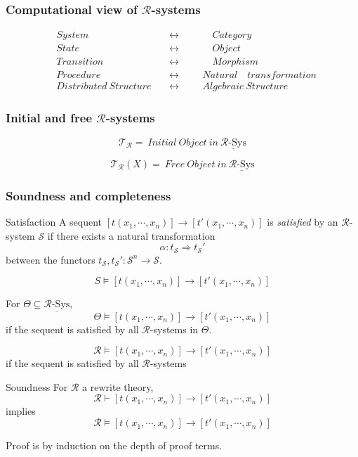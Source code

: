 \documentclass{beamer}
\begin{document}
\begin{frame}
    \frametitle{Computational view of $\mathcal{R}$-systems}
    \large
    \begin{align*}
        &System \quad &&\leftrightarrow  &&&\quad Category \\
        &State \quad &&\leftrightarrow &&&\quad  Object \\
        &Transition \quad &&\leftrightarrow &&&\quad Morphism \\ 
        &Procedure \quad &&\leftrightarrow &&&Natural \quad transformation \\ 
        &Distributed\ Structure\ &&\leftrightarrow &&& Algebraic\ Structure 
    \end{align*}
\end{frame}
\begin{frame}
    \large
    \frametitle{Initial and free $\mathcal{R}$-systems}
   
    $$\mathcal{T_R} =\ Initial\ Object\ in\ \underline{\mathcal{R}\text{-Sys}} $$ 


    \bigskip
    $$\mathcal{T_R}(X) =\ Free\ Object\ in\ \underline{\mathcal{R}\text{-Sys}} $$ 
    
\end{frame}
\begin{frame}
    \frametitle{Soundness and completeness}
    \scriptsize
    \begin{block}{Satisfaction}
        A sequent $[t(x_1,\cdots,x_n)] \rightarrow [t'(x_1,\cdots,x_n)]$ is \emph{satisfied} by 
        an $\mathcal{R}$-system $\mathcal{S}$ if there exists a natural transformation
        $$ \alpha: t_\mathcal{S} \Rightarrow t_\mathcal{S}'$$ 
        between the functors $t_\mathcal{S},t_\mathcal{S}':\mathcal{S}^n \rightarrow \mathcal{S}.$

        $$ S \models [t(x_1,\cdots,x_n)] \rightarrow [t'(x_1,\cdots,x_n)]$$
    \end{block}
\pause

For $\Theta \subseteq \underline{\mathcal{R}\text{-Sys}}$,
$$ \Theta \models [t(x_1,\cdots,x_n)] \rightarrow [t'(x_1,\cdots,x_n)]$$
if the sequent is satisfied by all $\mathcal{R}$-systems in $\Theta$.

\pause 
$$ \mathcal{R} \models [t(x_1,\cdots,x_n)] \rightarrow [t'(x_1,\cdots,x_n)]$$
if the sequent is satisfied by all $\mathcal{R}$-systems
\end{frame}
\begin{frame}
\begin{block}{Soundness}
    For $\mathcal{R}$ a rewrite theory,
    $$ \mathcal{R} \vdash [t(x_1,\cdots,x_n)] \rightarrow [t'(x_1,\cdots,x_n)]
    $$
    implies
    $$\mathcal{R} \models [t(x_1,\cdots,x_n)] \rightarrow [t'(x_1,\cdots,x_n)]
    $$ 
\end{block}
Proof is by induction on the depth of proof terms.
\end{frame}
\end{document}
